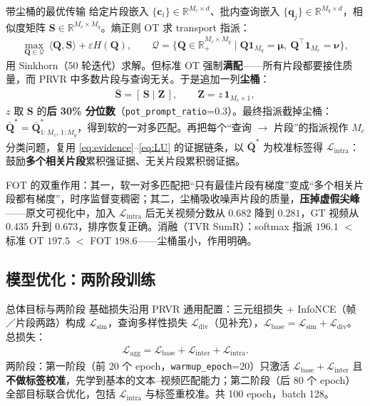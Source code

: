 \documentclass[11pt,a4paper,UTF8,fontset=windows]{ctexart}
\newcommand{\code}[1]{\texttt{#1}}
\newcommand{\term}[1]{\textbf{#1}}
\newcommand{\vect}[1]{\boldsymbol{#1}}
\begin{document}
\begin{structbox}{带尘桶的最优传输}
给定片段嵌入 $\{\vect c_i\}\in\mathbb{R}^{M_c\times d}$、批内查询嵌入 $\{\vect q_j\}\in\mathbb{R}^{M_q\times d}$，相似度矩阵 $\vect S\in\mathbb{R}^{M_c\times M_q}$。熵正则 OT 求 transport 指派：
\begin{align}
\max_{\vect Q\in\mathcal{Q}}\ \langle\vect Q,\vect S\rangle + \varepsilon H(\vect Q),
\qquad \mathcal{Q} = \{\vect Q\in\mathbb{R}^{M_c\times M_q}_+ \mid \vect Q\vect 1_{M_q}=\vect\mu,\ \vect Q^\top\vect 1_{M_c}=\vect\nu\},
\end{align}
用 Sinkhorn（50 轮迭代）求解。但标准 OT 强制\term{满配}——所有片段都要接住质量，而 PRVR 中多数片段与查询无关。于是追加一列\term{尘桶}：
\begin{align}
\bar{\vect S} = [\,\vect S \mid \vect Z\,],\qquad \vect Z = z\,\vect 1_{M_c\times 1},
\end{align}
$z$ 取 $\vect S$ 的\term{后 30\% 分位数}（\code{pot\_prompt\_ratio}=0.3）。最终指派截掉尘桶：$\bar{\vect Q}^* = \bar{\vect Q}^*_{1:M_c,\,1:M_q}$，得到软的一对多匹配。再把每个“查询 $\to$ 片段”的指派视作 $M_c$ 分类问题，复用 \eqref{eq:evidence}--\eqref{eq:LU} 的证据链条，以 $\bar{\vect Q}^*$ 为校准标签得 $\mathcal{L}_{\mathrm{intra}}$：鼓励\term{多个相关片段}累积强证据、无关片段累积弱证据。
\end{structbox}

FOT 的双重作用：其一，软一对多匹配把“只有最佳片段有梯度”变成“多个相关片段都有梯度”，时序监督变稠密；其二，尘桶吸收噪声片段的质量，\term{压掉虚假尖峰}——原文可视化中，加入 $\mathcal{L}_{\mathrm{intra}}$ 后无关视频分数从 $0.682$ 降到 $0.281$，GT 视频从 $0.435$ 升到 $0.673$，排序恢复正确。消融（TVR SumR）：softmax 指派 $196.1$ $<$ 标准 OT $197.5$ $<$ FOT $198.6$——尘桶虽小，作用明确。

\subsection{模型优化：两阶段训练}

\begin{structbox}{总体目标与两阶段}
基础损失沿用 PRVR 通用配置：三元组损失 + InfoNCE（帧／片段两路）构成 $\mathcal{L}_{\mathrm{sim}}$，查询多样性损失 $\mathcal{L}_{\mathrm{div}}$（见补充），$\mathcal{L}_{\mathrm{base}}=\mathcal{L}_{\mathrm{sim}}+\mathcal{L}_{\mathrm{div}}$。总损失：
\begin{align}
\mathcal{L}_{\mathrm{agg}} = \mathcal{L}_{\mathrm{base}} + \mathcal{L}_{\mathrm{inter}} + \mathcal{L}_{\mathrm{intra}}.
\end{align}
两阶段：第一阶段（前 20 个 epoch，\code{warmup\_epoch}=20）只激活 $\mathcal{L}_{\mathrm{base}}+\mathcal{L}_{\mathrm{inter}}$ 且\term{不做标签校准}，先学到基本的文本–视频匹配能力；第二阶段（后 80 个 epoch）全部目标联合优化，包括 $\mathcal{L}_{\mathrm{intra}}$ 与标签重校准。共 100 epoch，batch 128。
\end{structbox}
\end{document}
